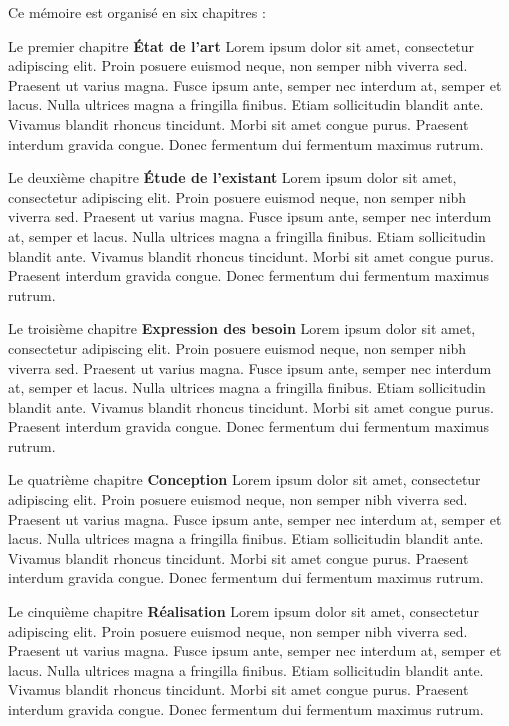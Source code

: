 Ce mémoire est organisé en six chapitres :

\medskip

Le premier chapitre \og \textbf{État de l'art} \fg Lorem ipsum dolor sit amet, consectetur adipiscing elit. Proin posuere euismod neque, non semper nibh viverra sed. Praesent ut varius magna. Fusce ipsum ante, semper nec interdum at, semper et lacus. Nulla ultrices magna a fringilla finibus. Etiam sollicitudin blandit ante. Vivamus blandit rhoncus tincidunt. Morbi sit amet congue purus. Praesent interdum gravida congue. Donec fermentum dui fermentum maximus rutrum.

\medskip

Le deuxième chapitre \og \textbf{Étude de l'existant} \fg Lorem ipsum dolor sit amet, consectetur adipiscing elit. Proin posuere euismod neque, non semper nibh viverra sed. Praesent ut varius magna. Fusce ipsum ante, semper nec interdum at, semper et lacus. Nulla ultrices magna a fringilla finibus. Etiam sollicitudin blandit ante. Vivamus blandit rhoncus tincidunt. Morbi sit amet congue purus. Praesent interdum gravida congue. Donec fermentum dui fermentum maximus rutrum.

\medskip

Le troisième chapitre \og \textbf{Expression des besoin} \fg Lorem ipsum dolor sit amet, consectetur adipiscing elit. Proin posuere euismod neque, non semper nibh viverra sed. Praesent ut varius magna. Fusce ipsum ante, semper nec interdum at, semper et lacus. Nulla ultrices magna a fringilla finibus. Etiam sollicitudin blandit ante. Vivamus blandit rhoncus tincidunt. Morbi sit amet congue purus. Praesent interdum gravida congue. Donec fermentum dui fermentum maximus rutrum.

Le quatrième chapitre \og \textbf{Conception} \fg Lorem ipsum dolor sit amet, consectetur adipiscing elit. Proin posuere euismod neque, non semper nibh viverra sed. Praesent ut varius magna. Fusce ipsum ante, semper nec interdum at, semper et lacus. Nulla ultrices magna a fringilla finibus. Etiam sollicitudin blandit ante. Vivamus blandit rhoncus tincidunt. Morbi sit amet congue purus. Praesent interdum gravida congue. Donec fermentum dui fermentum maximus rutrum.

Le cinquième chapitre \og \textbf{Réalisation} \fg Lorem ipsum dolor sit amet, consectetur adipiscing elit. Proin posuere euismod neque, non semper nibh viverra sed. Praesent ut varius magna. Fusce ipsum ante, semper nec interdum at, semper et lacus. Nulla ultrices magna a fringilla finibus. Etiam sollicitudin blandit ante. Vivamus blandit rhoncus tincidunt. Morbi sit amet congue purus. Praesent interdum gravida congue. Donec fermentum dui fermentum maximus rutrum.

